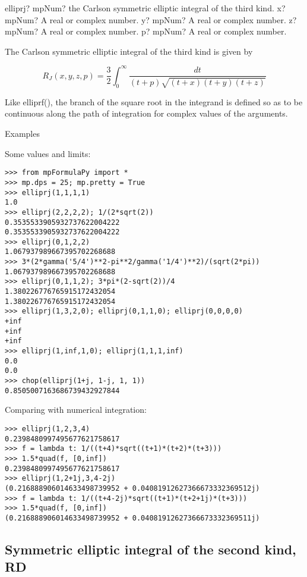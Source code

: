 \begin{mpFunctionsExtract}
	\mpFunctionFour
	{elliprj? mpNum? the Carlson symmetric elliptic integral of the third kind.}
	{x? mpNum? A real or complex number.}	
	{y? mpNum? A real or complex number.}
	{z? mpNum? A real or complex number.}
	{p? mpNum? A real or complex number.}		
\end{mpFunctionsExtract}

\vpara
The Carlson symmetric elliptic integral of the third kind is given by

\begin{equation}
R_J(x,y,z,p)=\frac{3}{2} \int_0^{\infty} \frac{dt}{(t+p)\sqrt{(t+x)(t+y)(t+z)}}
\end{equation}

Like elliprf(), the branch of the square root in the integrand is defined so as to be continuous along the path of integration for complex values of the arguments.

Examples

Some values and limits:


\begin{lstlisting}
>>> from mpFormulaPy import *
>>> mp.dps = 25; mp.pretty = True
>>> elliprj(1,1,1,1)
1.0
>>> elliprj(2,2,2,2); 1/(2*sqrt(2))
0.3535533905932737622004222
0.3535533905932737622004222
>>> elliprj(0,1,2,2)
1.067937989667395702268688
>>> 3*(2*gamma('5/4')**2-pi**2/gamma('1/4')**2)/(sqrt(2*pi))
1.067937989667395702268688
>>> elliprj(0,1,1,2); 3*pi*(2-sqrt(2))/4
1.380226776765915172432054
1.380226776765915172432054
>>> elliprj(1,3,2,0); elliprj(0,1,1,0); elliprj(0,0,0,0)
+inf
+inf
+inf
>>> elliprj(1,inf,1,0); elliprj(1,1,1,inf)
0.0
0.0
>>> chop(elliprj(1+j, 1-j, 1, 1))
0.8505007163686739432927844
\end{lstlisting}

Comparing with numerical integration:

\begin{lstlisting}
>>> elliprj(1,2,3,4)
0.2398480997495677621758617
>>> f = lambda t: 1/((t+4)*sqrt((t+1)*(t+2)*(t+3)))
>>> 1.5*quad(f, [0,inf])
0.2398480997495677621758617
>>> elliprj(1,2+1j,3,4-2j)
(0.216888906014633498739952 + 0.04081912627366673332369512j)
>>> f = lambda t: 1/((t+4-2j)*sqrt((t+1)*(t+2+1j)*(t+3)))
>>> 1.5*quad(f, [0,inf])
(0.216888906014633498739952 + 0.04081912627366673332369511j)
\end{lstlisting}




\subsection{Symmetric elliptic integral of the second kind, RD}

